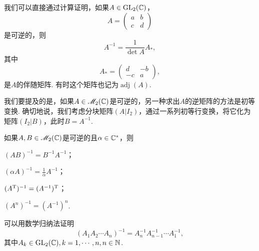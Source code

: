   我们可以直接通过计算证明，如果$A\in\operatorname{GL}_2(\mathbb C)$，
  \[
    A = \begin{pmatrix}
      a & b \\
      c & d
    \end{pmatrix}
  \]
  是可逆的，则
  \[
    A^{-1} = \frac1{\det A}A_\ast,
  \]
  其中
  \[
    A_\ast = \begin{pmatrix}
      d & -b \\
      -c & a
    \end{pmatrix},
  \]
  是$A$的{\kaishu 伴随矩阵}. 有时这个矩阵也记为$\operatorname{adj}(A)$.

  \begin{remark}
    我们要提及的是，如果$A\in\mathscr M_2(\mathbb C)$是可逆的，另一种求出$A$的逆矩阵的方法是初等变换. 确切地说，我们考虑{\kaishu 分块矩阵}$(A|I_2)$，通过一系列初等行变换，将它化为矩阵$(I_2|B)$，此时$B=A^{-1}$.
  \end{remark}

  \begin{property}
    如果$A,B\in\mathscr M_2(\mathbb C)$是可逆的且$\alpha\in \mathbb C^\ast$，则
    \begin{enum}
      \item $(AB)^{-1}=B^{-1}A^{-1}$；
      \item $(\alpha A)^{-1}=\frac1{\alpha}A^{-1}$；
      \item $(A^{\mathrm T})^{-1}=(A^{-1})^{\mathrm T}$；
      \item $(A^n)^{-1}=(A^{-1})^n$.
    \end{enum}
  \end{property}

  可以用数学归纳法证明
  \[
    (A_1A_2\cdots A_n)^{-1} = A_n^{-1}A_{n-1}^{-1}\cdots A_1^{-1},
  \]
  其中$A_k\in\operatorname{GL}_2(\mathbb C),k=1,\cdots,n,n\in\mathbb N$.

